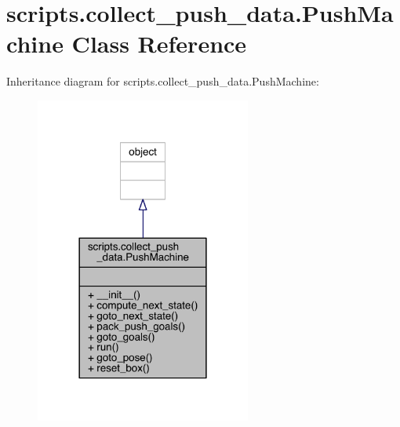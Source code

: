 \hypertarget{classscripts_1_1collect__push__data_1_1_push_machine}{}\section{scripts.\+collect\+\_\+push\+\_\+data.\+Push\+Machine Class Reference}
\label{classscripts_1_1collect__push__data_1_1_push_machine}


Inheritance diagram for scripts.\+collect\+\_\+push\+\_\+data.\+Push\+Machine\+:\nopagebreak
\begin{figure}[H]
\begin{center}
\leavevmode
\includegraphics[width=201pt]{classscripts_1_1collect__push__data_1_1_push_machine__inherit__graph}
\end{center}
\end{figure}


